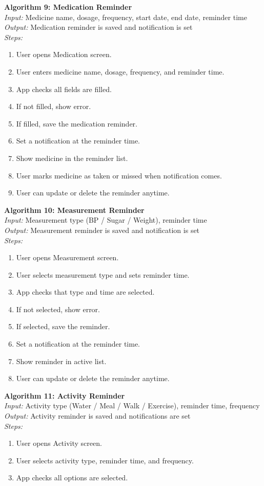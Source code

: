 \documentclass[12pt, a4paper, oneside]{report}
\begin{document}
\textbf{Algorithm 9: Medication Reminder}\\
\textit{Input:} Medicine name, dosage, frequency, start date, end date, reminder time\\
\textit{Output:} Medication reminder is saved and notification is set\\
\textit{Steps:}
\begin{enumerate}
    \item User opens Medication screen.
    \item User enters medicine name, dosage, frequency, and reminder time.
    \item App checks all fields are filled.
    \item If not filled, show error.
    \item If filled, save the medication reminder.
    \item Set a notification at the reminder time.
    \item Show medicine in the reminder list.
    \item User marks medicine as taken or missed when notification comes.
    \item User can update or delete the reminder anytime.
\end{enumerate}

\textbf{Algorithm 10: Measurement Reminder}\\
\textit{Input:} Measurement type (BP / Sugar / Weight), reminder time\\
\textit{Output:} Measurement reminder is saved and notification is set\\
\textit{Steps:}
\begin{enumerate}
    \item User opens Measurement screen.
    \item User selects measurement type and sets reminder time.
    \item App checks that type and time are selected.
    \item If not selected, show error.
    \item If selected, save the reminder.
    \item Set a notification at the reminder time.
    \item Show reminder in active list.
    \item User can update or delete the reminder anytime.
\end{enumerate}

\textbf{Algorithm 11: Activity Reminder}\\
\textit{Input:} Activity type (Water / Meal / Walk / Exercise), reminder time, frequency\\
\textit{Output:} Activity reminder is saved and notifications are set\\
\textit{Steps:}
\begin{enumerate}
    \item User opens Activity screen.
    \item User selects activity type, reminder time, and frequency.
    \item App checks all options are selected.
\end{enumerate}
\end{document}
